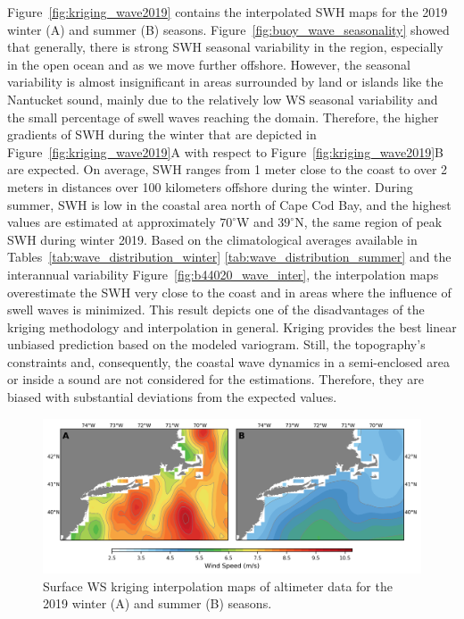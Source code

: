 Figure~\ref{fig:kriging_wave2019} contains the interpolated SWH maps for the 2019 winter (A) and summer (B) seasons. Figure~\ref{fig:buoy_wave_seasonality} showed that generally, there is strong SWH seasonal variability in the region, especially in the open ocean and as we move further offshore. However, the seasonal variability is almost insignificant in areas surrounded by land or islands like the Nantucket sound, mainly due to the relatively low WS seasonal variability and the small percentage of swell waves reaching the domain. Therefore, the higher gradients of SWH during the winter that are depicted in Figure~\ref{fig:kriging_wave2019}A with respect to Figure~\ref{fig:kriging_wave2019}B are expected. On average, SWH ranges from 1 meter close to the coast to over 2 meters in distances over 100 kilometers offshore during the winter. During summer, SWH is low in the coastal area north of Cape Cod Bay, and the highest values are estimated at approximately $70^{\circ}$W and $39^{\circ}$N, the same region of peak SWH during winter 2019. Based on the climatological averages available in Tables~\ref{tab:wave_distribution_winter} \ref{tab:wave_distribution_summer} and the interannual variability Figure~\ref{fig:b44020_wave_inter}, the interpolation maps overestimate the SWH very close to the coast and in areas where the influence of swell waves is minimized. This result depicts one of the disadvantages of the kriging methodology and interpolation in general.  Kriging provides the best linear unbiased prediction based on the modeled variogram. Still, the topography's constraints and, consequently, the coastal wave dynamics in a semi-enclosed area or inside a sound are not considered for the estimations. Therefore, they are biased with substantial deviations from the expected values.

\begin{figure}[H]
\centering
\includegraphics[width=0.95\linewidth]{Figures/Chapter5/kriging_wintsumm2019_wind.png}
\caption{Surface WS kriging interpolation maps of altimeter data for the 2019 winter (A) and summer (B) seasons.}
\label{fig:kriging_wind2019}
\end{figure}


